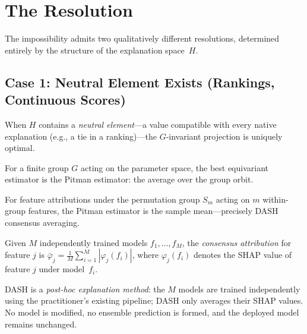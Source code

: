 

\section{The Resolution}
\label{sec:resolution}

The impossibility admits two qualitatively different resolutions, determined entirely by the structure of the explanation space~$H$.

\subsection{Case 1: Neutral Element Exists (Rankings, Continuous Scores)}

When $H$ contains a \emph{neutral element}---a value compatible with every native explanation (e.g., a tie in a ranking)---the $G$-invariant projection is uniquely optimal.

\begin{theorem}
\label{thm:hunt-stein}
For a finite group $G$ acting on the parameter space, the best equivariant estimator is the Pitman estimator: the average over the group orbit.
\end{theorem}

For feature attributions under the permutation group $S_m$ acting on $m$ within-group features, the Pitman estimator is the sample mean---precisely DASH consensus averaging.

\begin{definition}
\label{def:dash}
Given $M$ independently trained models $f_1, \ldots, f_M$, the \emph{consensus attribution} for feature $j$ is $\bar{\varphi}_j = \frac{1}{M} \sum_{i=1}^{M} |\varphi_j(f_i)|$, where $\varphi_j(f_i)$ denotes the SHAP value of feature $j$ under model~$f_i$.
\end{definition}

DASH is a \emph{post-hoc explanation method}: the $M$ models are trained independently using the practitioner's existing pipeline; DASH only averages their SHAP values. No model is modified, no ensemble prediction is formed, and the deployed model remains unchanged.

